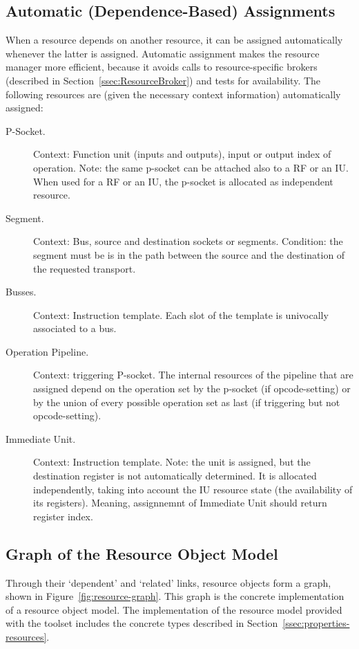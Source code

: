 \documentclass[a4paper,twoside]{tce}
\begin{document}
\subsection{Automatic (Dependence-Based) Assignments}

When a resource depends on another resource, it can be assigned
automatically whenever the latter is assigned. Automatic assignment makes
the resource manager more efficient, because it avoids calls to
resource-specific brokers (described in Section~\ref{ssec:ResourceBroker})
and tests for availability. The following resources are (given the necessary
context information) automatically assigned:
\begin{description}
\item[P-Socket.]%
  Context: Function unit (inputs and outputs), input or output index of
  operation. Note: the same p-socket can be attached also to a RF or an IU.
  When used for a RF or an IU, the p-socket is allocated as independent
  resource.
\item[Segment.]%
  Context: Bus, source and destination sockets or segments. Condition: the
  segment must be is in the path between the source and the destination of
  the requested transport.
\item[Busses.]%
  Context: Instruction template. Each slot of the template is univocally
  associated to a bus.
%
\item[Operation Pipeline.]%
  Context: triggering P-socket. The internal resources of the pipeline that
  are assigned depend on the operation set by the p-socket (if
  opcode-setting) or by the union of every possible operation set as last
  (if triggering but not opcode-setting).
\item[Immediate Unit.]%
  Context: Instruction template. Note: the unit is assigned, but the
  destination register is not automatically determined. It is allocated
  independently, taking into account the IU resource state (the availability
  of its registers). Meaning, assignnemnt of Immediate Unit should return
  register index.
\end{description}

\subsection{Graph of the Resource Object Model}
\label{ssec:resource-graph}

Through their `dependent' and `related' links, resource objects form a
graph, shown in Figure~\ref{fig:resource-graph}.
%
This graph is the concrete implementation of a resource object model. The
implementation of the resource model provided with the toolset includes the
concrete types described in Section~\ref{ssec:properties-resources}.
\end{document}
